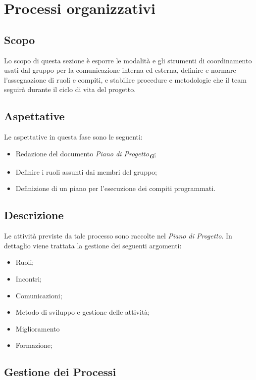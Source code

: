 

\section{Processi organizzativi}
\label{sec:processi_organizzativi}

\subsection{Scopo}
Lo scopo di questa sezione è esporre le modalità e gli strumenti di coordinamento usati dal gruppo per la comunicazione interna ed esterna, 
definire e normare l’assegnazione di ruoli e compiti, e stabilire procedure e metodologie che il team seguirà durante il 
ciclo di vita del progetto.

\subsection{Aspettative}
Le aspettative in questa fase sono le seguenti:
\begin{itemize}
    \item Redazione del documento \emph{Piano di Progetto}\textsubscript{\textit{\textbf{G}}};
    \item Definire i ruoli assunti dai membri del gruppo;
    \item Definizione di un piano per l'esecuzione dei compiti programmati.
\end{itemize}

\subsection{Descrizione}
Le attività previste da tale processo sono raccolte nel \emph{Piano di Progetto}.
In dettaglio viene trattata la gestione dei seguenti argomenti:
\begin{itemize}
    \item Ruoli;
    \item Incontri;
    \item Comunicazioni;
    \item Metodo di sviluppo e gestione delle attività;
    \item Miglioramento
    \item Formazione;
\end{itemize}

\subsection{Gestione dei Processi}
